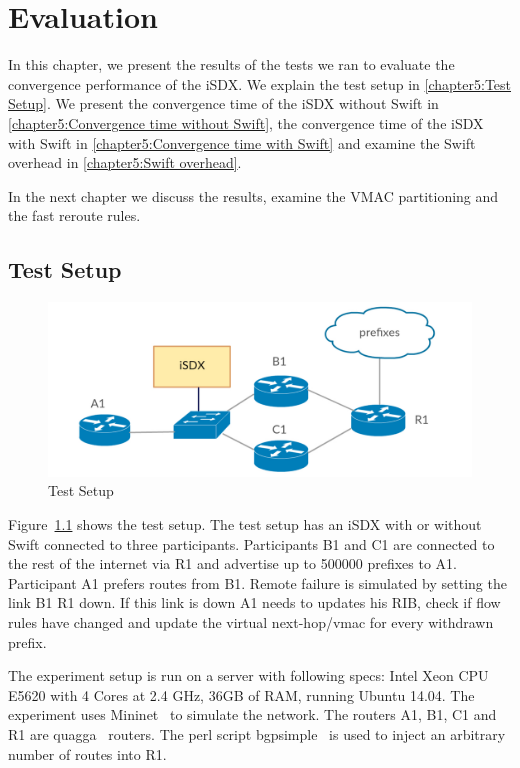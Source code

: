 \chapter{\label{chapter5}Evaluation}

In this chapter, we present the results of the tests we ran to evaluate the convergence performance of the iSDX. We explain the test setup in \ref{chapter5:Test Setup}. We present the convergence time of the iSDX without Swift in \ref{chapter5:Convergence time without Swift}, the convergence time of the iSDX with Swift in \ref{chapter5:Convergence time with Swift} and examine the Swift overhead in \ref{chapter5:Swift overhead}.

In the next chapter we discuss the results, examine the VMAC partitioning and the fast reroute rules.

\section{\label{chapter5:Test Setup}Test Setup}

\begin{figure}[h]
\center
\includegraphics[scale = 0.36]{Figures/eval_exp_setup.pdf}
\caption{Test Setup}
\label{fig:test-setup}
\end{figure}

Figure~\ref{fig:test-setup} shows the test setup.
The test setup has an iSDX with or without Swift connected to three participants. Participants B1 and C1 are connected to the rest of the internet via R1 and advertise up to 500000 prefixes to A1. Participant A1 prefers routes from B1. Remote failure is simulated by setting the link B1 R1 down. If this link is down A1 needs to updates his RIB, check if flow rules have changed and update the virtual next-hop/vmac for every withdrawn prefix.

The experiment setup is run on a server with following specs: Intel Xeon CPU E5620 with 4 Cores at 2.4 GHz, 36GB of RAM, running Ubuntu 14.04. The experiment uses Mininet~\cite{mininet} to simulate the network. The routers A1, B1, C1 and R1 are quagga~\cite{quagga} routers. The perl script bgpsimple~\cite{bgpsimple} is used to inject an arbitrary number of routes into R1. 

